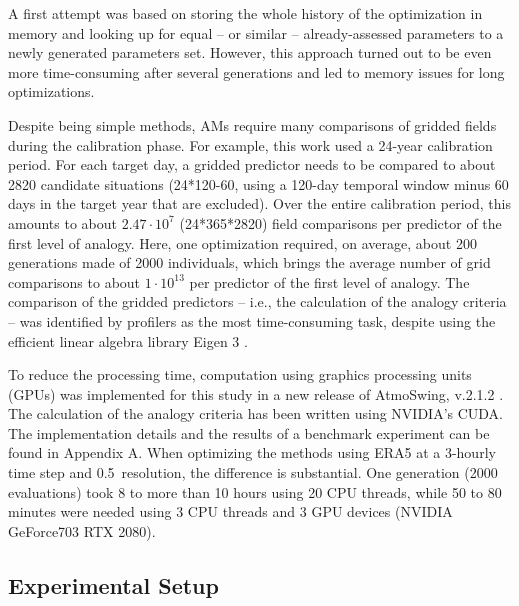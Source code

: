 \documentclass[draft]{agujournal2019}
\begin{document}
A first attempt was based on storing the whole history of the optimization in memory and looking up for equal -- or similar -- already-assessed parameters to a newly generated parameters set. However, this approach turned out to be even more time-consuming after several generations and led to memory issues for long optimizations.

Despite being simple methods, AMs require many comparisons of gridded fields during the calibration phase. For example, this work used a 24-year calibration period. For each target day, a gridded predictor needs to be compared to about 2820 candidate situations (24*120-60, using a 120-day temporal window minus 60 days in the target year that are excluded). Over the entire calibration period, this amounts to about $2.47\cdot10^7$ (24*365*2820) field comparisons per predictor of the first level of analogy. Here, one optimization required, on average, about 200 generations made of 2000 individuals, which brings the average number of grid comparisons to about $1\cdot10^{13}$ per predictor of the first level of analogy. The comparison of the gridded predictors – i.e., the calculation of the analogy criteria -- was identified by profilers as the most time-consuming task, despite using the efficient linear algebra library Eigen 3 \cite{Guennebaud2010}.

To reduce the processing time, computation using graphics processing units (GPUs) was implemented for this study in a new release of AtmoSwing, v.2.1.2 \cite{Horton2019b}. The calculation of the analogy criteria has been written using NVIDIA's CUDA. The implementation details and the results of a benchmark experiment can be found in Appendix A. When optimizing the methods using ERA5 at a 3-hourly time step and 0.5\degree\ resolution, the difference is substantial. One generation (2000 evaluations) took 8 to more than 10 hours using 20 CPU threads, while 50 to 80 minutes were needed using 3 CPU threads and 3 GPU devices (NVIDIA GeForce703 RTX 2080).


\subsection{Experimental Setup}
\label{setup}
\end{document}
